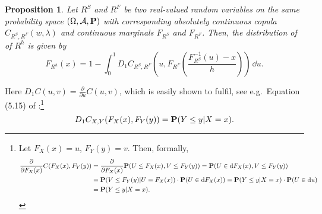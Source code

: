 \documentclass[square]{article} %
\theoremstyle{plain}
\newtheorem{proposition}[theorem]{Proposition}
\theoremstyle{definition} %
\begin{document}
\begin{proposition}
  \label{prop:dfrh}
  Let $R^S$ and $R^F$ be two real-valued random variables on the same
  probability space $(\Omega, \mathcal A, {\bf P})$ with corresponding
  absolutely continuous copula $C_{R^S, R^F}(w,\lambda)$ and
  continuous marginals $F_{R^S}$ and $F_{R^F}$. Then, the distribution
  of of $R^h$ is given by
  \begin{equation}
    \label{eq:3}
    F_{R^h}(x) = 1- \int^1_0 D_1 C_{R^S, R^F}
    \left( u, F_{R^F} \left( \frac{F^{-1}_{R^S}(u)-x}{h} \right)
    \right)\, \dd u.  
  \end{equation}
\end{proposition}
Here $D_1 C(u,v)=\displaystyle \frac{\partial}{\partial u} C(u,v)$,
which is easily shown to fulfil, see e.g.\ Equation (5.15) of
\citep{McNeil2005}:\footnote{%
  Let $F_X(x)=u$, $F_Y(y)=v$. Then, formally,
  \begin{align*}
    \frac{\partial}{\partial F_X(x)} C(F_X(x), F_Y(y)) %
    &= \frac{\partial}{\partial F_X(x)} \p(U\leq F_X(x),
      V\leq F_Y(y)) %
      = \p(U\in \dd F_X(x), V\leq F_Y(y))\\ %
    &= \p(V\leq F_Y(y)| U = F_X(x))\cdot \p(U \in \dd
      F_X(x)) %
      = \p(Y\leq y|X=x)\cdot \p(U\in \dd u)\\ %
    &= \p(Y\leq y|X=x).
  \end{align*}
  }
\begin{equation}
  \label{eq:1}
  D_1 C_{X,Y}(F_X(x), F_Y(y)) = {\bf P}(Y\leq y|X=x).
\end{equation}
\end{document}
